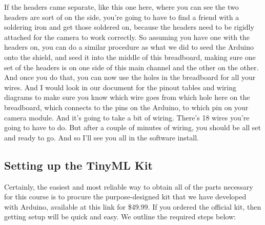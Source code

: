 If the headers came separate, like this one here, where you can see the two headers are sort of on the side, you're going to have to find a friend with a soldering iron and get those soldered on, because the headers need to be rigidly attached for the camera to work correctly.
So assuming you have one with the headers on, you can do a similar procedure as what we did to seed the Arduino onto the shield, and seed it into the middle of this breadboard, making sure one set of the headers is on one side of this main channel and the other on the other.
And once you do that, you can now use the holes in the breadboard for all your wires.
And I would look in our document for the pinout tables and wiring diagrams to make sure you know which wire goes from which hole here on the breadboard, which connects to the pins on the Arduino, to which pin on your camera module.
And it's going to take a bit of wiring.
There's 18 wires you're going to have to do.
But after a couple of minutes of wiring, you should be all set and ready to go.
And so I'll see you all in the software install.

\subsection{Setting up the TinyML Kit}

Certainly, the easiest and most reliable way to obtain all of the parts necessary for this course is to procure the purpose-designed kit that we have developed with Arduino, available at this link for \$49.99. If you ordered the official kit, then getting setup will be quick and easy. We outline the required steps below:
    
